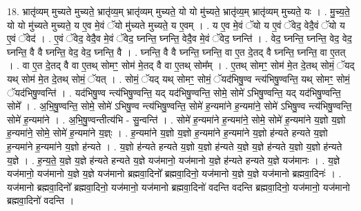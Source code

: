 \documentclass[17pt]{extarticle}
\begin{document}
18. भ्रातृ॑व्यम् मुच्यते मुच्यते॒ भ्रातृ॑व्य॒म् भ्रातृ॑व्यम् मुच्यते॒ यो यो मु॑च्यते॒ भ्रातृ॑व्य॒म् भ्रातृ॑व्यम् मुच्यते॒ यः । . मु॒च्य॒ते॒ यो यो मु॑च्यते मुच्यते॒ य ए॒व मे॒वं ॅयो मु॑च्यते मुच्यते॒ य ए॒वम् । . य ए॒व मे॒वं ॅयो य ए॒वं ॅवेद॒ वेदै॒वं ॅयो य ए॒वं ॅवेद॑ । . ए॒वं ॅवेद॒ वेदै॒व मे॒वं ॅवेद॒ घ्नन्ति॒ घ्नन्ति॒ वेदै॒व मे॒वं ॅवेद॒ घ्नन्ति॑ । . वेद॒ घ्नन्ति॒ घ्नन्ति॒ वेद॒ वेद॒ घ्नन्ति॒ वै वै घ्नन्ति॒ वेद॒ वेद॒ घ्नन्ति॒ वै । . घ्नन्ति॒ वै वै घ्नन्ति॒ घ्नन्ति॒ वा ए॒त दे॒तद् वै घ्नन्ति॒ घ्नन्ति॒ वा ए॒तत् । . वा ए॒त दे॒तद् वै वा ए॒तथ् सोमꣳ॒॒ सोम॑ मे॒तद् वै वा ए॒तथ् सोम᳚म् । . ए॒तथ् सोमꣳ॒॒ सोम॑ मे॒त दे॒तथ् सोमं॒ ॅयद् यथ् सोम॑ मे॒त दे॒तथ् सोमं॒ ॅयत् । . सोमं॒ ॅयद् यथ् सोमꣳ॒॒ सोमं॒ ॅयद॑भिषु॒ण्व न्त्य॑भिषु॒ण्वन्ति॒ यथ् सोमꣳ॒॒ सोमं॒ ॅयद॑भिषु॒ण्वन्ति॑ । . यद॑भिषु॒ण्व न्त्य॑भिषु॒ण्वन्ति॒ यद् यद॑भिषु॒ण्वन्ति॒ सोमे॒ सोमे॑ ऽभिषु॒ण्वन्ति॒ यद् यद॑भिषु॒ण्वन्ति॒ सोमे᳚ । . अ॒भि॒षु॒ण्वन्ति॒ सोमे॒ सोमे॑ ऽभिषु॒ण्व न्त्य॑भिषु॒ण्वन्ति॒ सोमे॑ ह॒न्यमा॑ने ह॒न्यमा॑ने॒ सोमे॑ ऽभिषु॒ण्व न्त्य॑भिषु॒ण्वन्ति॒ सोमे॑ ह॒न्यमा॑ने । . अ॒भि॒षु॒ण्वन्तीत्य॑भि - सु॒न्वन्ति॑ । . सोमे॑ ह॒न्यमा॑ने ह॒न्यमा॑ने॒ सोमे॒ सोमे॑ ह॒न्यमा॑ने य॒ज्ञो य॒ज्ञो ह॒न्यमा॑ने॒ सोमे॒ सोमे॑ ह॒न्यमा॑ने य॒ज्ञ्ः । . ह॒न्यमा॑ने य॒ज्ञो य॒ज्ञो ह॒न्यमा॑ने ह॒न्यमा॑ने य॒ज्ञो ह॑न्यते हन्यते य॒ज्ञो ह॒न्यमा॑ने ह॒न्यमा॑ने य॒ज्ञो ह॑न्यते । . य॒ज्ञो ह॑न्यते हन्यते य॒ज्ञो य॒ज्ञो ह॑न्यते य॒ज्ञे य॒ज्ञे ह॑न्यते य॒ज्ञो य॒ज्ञो ह॑न्यते य॒ज्ञे । . ह॒न्य॒ते॒ य॒ज्ञे य॒ज्ञे ह॑न्यते हन्यते य॒ज्ञे यज॑मानो॒ यज॑मानो य॒ज्ञे ह॑न्यते हन्यते य॒ज्ञे यज॑मानः । . य॒ज्ञे यज॑मानो॒ यज॑मानो य॒ज्ञे य॒ज्ञे यज॑मानो ब्रह्मवा॒दिनो᳚ ब्रह्मवा॒दिनो॒ यज॑मानो य॒ज्ञे य॒ज्ञे यज॑मानो ब्रह्मवा॒दिनः॑ । . यज॑मानो ब्रह्मवा॒दिनो᳚ ब्रह्मवा॒दिनो॒ यज॑मानो॒ यज॑मानो ब्रह्मवा॒दिनो॑ वदन्ति वदन्ति ब्रह्मवा॒दिनो॒ यज॑मानो॒ यज॑मानो ब्रह्मवा॒दिनो॑ वदन्ति । \newline
\end{document}
